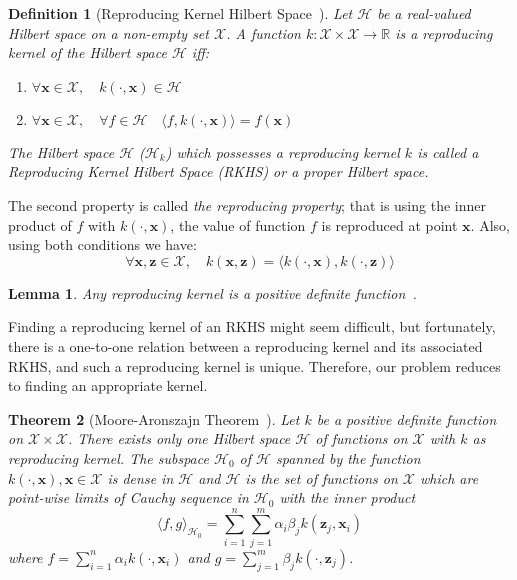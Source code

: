 \documentclass[conference]{IEEEtran}
\newtheorem{theorem}{Theorem}
\newtheorem{lemma}[theorem]{Lemma}
\newtheorem{definition}{Definition}
\newcommand{\Hcal}{\mathcal{H}}
\newcommand{\Xcal}{\mathcal{X}}
\begin{document}
\begin{definition}[Reproducing Kernel Hilbert Space~\citep{berlinet2004reproducing}]
Let $\Hcal$ be a real-valued Hilbert space on a non-empty set $\Xcal$. A function $k:\Xcal \times \Xcal \to \mathbb{R}$ is a reproducing kernel of the Hilbert space $\Hcal$ iff:
\begin{enumerate}
	\item $\forall \mathbf{x} \in \Xcal, \quad k(\cdot, \mathbf{x}) \in \Hcal$ 
	\item $\forall \mathbf{x} \in \Xcal, \quad \forall f \in \Hcal \quad \langle f, k(\cdot, \mathbf{x}) \rangle = f(\mathbf{x})$
\end{enumerate}
The Hilbert space $\Hcal$ ($\Hcal_k$) which possesses a reproducing kernel $k$ is called  a Reproducing Kernel Hilbert Space (RKHS) or a proper Hilbert space.
\end{definition}

The second property is called \emph{the reproducing property}; that is using the inner product of $f$ with $k(\cdot,\mathbf{x})$, the value of function $f$ is reproduced at point $\mathbf{x}$. Also, using both conditions we have:
\begin{equation}
	\nonumber \forall \mathbf{x}, \mathbf{z} \in \Xcal, \quad k(\mathbf{x},\mathbf{z}) = \langle k(\cdot, \mathbf{x}), k(\cdot, \mathbf{z}) \rangle
\end{equation}

\begin{lemma}
Any reproducing kernel is a positive definite function~\citep{berlinet2004reproducing}.
\end{lemma}

Finding a reproducing kernel of an RKHS might seem difficult, but fortunately, there is a one-to-one relation between a reproducing kernel and its associated RKHS, and such a reproducing kernel is unique. Therefore, our problem reduces to finding an appropriate kernel.

\begin{theorem}[Moore-Aronszajn Theorem~\citep{berlinet2004reproducing}]
\label{th:ma}
Let $k$ be a positive definite function on $\Xcal \times \Xcal$. There exists only one Hilbert space $\Hcal$ of functions on $\Xcal$ with $k$ as reproducing kernel. The subspace $\Hcal_0$ of $\Hcal$ spanned by the function $k(\cdot, \mathbf{x}), \mathbf{x} \in \Xcal$ is dense in $\Hcal$ and $\Hcal$ is the set of functions on $\Xcal$ which are point-wise limits of Cauchy sequence in $\Hcal_0$ with the inner product 
\begin{equation}
\label{eq:iprkhs}
	\langle f, g \rangle_{\Hcal_0} = \sum_{i=1}^n \sum_{j=1}^m \alpha_i \beta_j k(\mathbf{z}_j, \mathbf{x}_i)
\end{equation}
where $f =  \sum_{i=1}^n \alpha_i k(\cdot, \mathbf{x}_i)$ and $g =  \sum_{j=1}^m \beta_j k(\cdot, \mathbf{z}_j)$.
\end{theorem}
\end{document}
